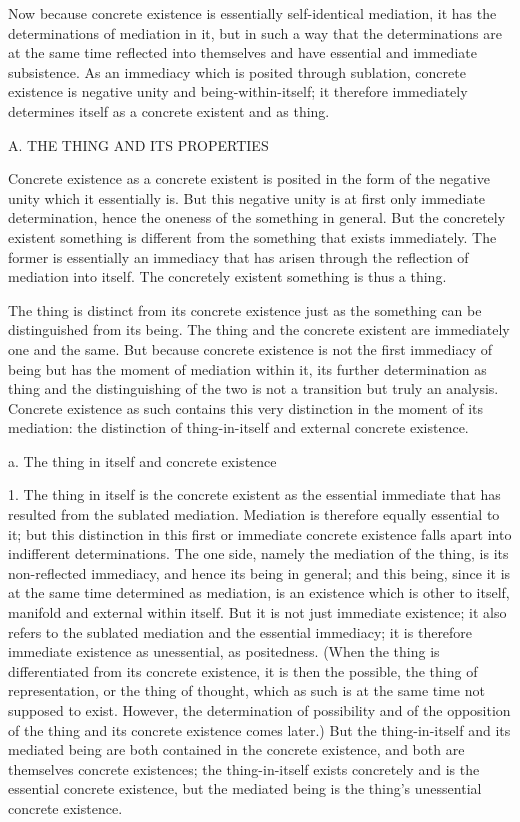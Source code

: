 Now because concrete existence is
essentially self-identical mediation,
it has the determinations of mediation in it,
but in such a way that the determinations are
at the same time reflected into themselves
and have essential and immediate subsistence.
As an immediacy which is posited through sublation,
concrete existence is negative unity and being-within-itself;
it therefore immediately determines itself
as a concrete existent and as thing.

A. THE THING AND ITS PROPERTIES

Concrete existence as a concrete existent is posited in
the form of the negative unity which it essentially is.
But this negative unity is at first only immediate determination,
hence the oneness of the something in general.
But the concretely existent something is different
from the something that exists immediately.
The former is essentially an immediacy that has arisen
through the reflection of mediation into itself.
The concretely existent something is thus a thing.

The thing is distinct from its concrete existence
just as the something can be distinguished from its being.
The thing and the concrete existent
are immediately one and the same.
But because concrete existence is not
the first immediacy of being
but has the moment of mediation within it,
its further determination as thing
and the distinguishing of the two is
not a transition but truly an analysis.
Concrete existence as such contains
this very distinction in the moment of its mediation:
the distinction of thing-in-itself
and external concrete existence.

a. The thing in itself and concrete existence

1. The thing in itself is the concrete existent
as the essential immediate that has resulted
from the sublated mediation.
Mediation is therefore equally essential to it;
but this distinction in this first
or immediate concrete existence
falls apart into indifferent determinations.
The one side, namely the mediation of the thing,
is its non-reflected immediacy,
and hence its being in general;
and this being, since it is
at the same time determined as mediation,
is an existence which is other to itself,
manifold and external within itself.
But it is not just immediate existence;
it also refers to the sublated mediation
and the essential immediacy;
it is therefore immediate existence
as unessential, as positedness.
(When the thing is differentiated
from its concrete existence,
it is then the possible,
the thing of representation,
or the thing of thought,
which as such is at the same time
not supposed to exist.
However, the determination of possibility
and of the opposition of the thing
and its concrete existence comes later.)
But the thing-in-itself and its mediated being are
both contained in the concrete existence,
and both are themselves concrete existences;
the thing-in-itself exists concretely
and is the essential concrete existence,
but the mediated being is
the thing's unessential concrete existence.

